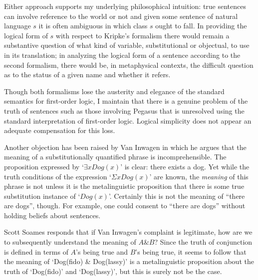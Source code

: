 \documentclass[12pt,letterpaper]{article}
\begin{document}
\begin{doublespace}
Either approach supports my underlying philosophical intuition: true
sentences can involve reference to the world or not and given some
sentence of natural language $s$ it is often ambiguous in which class
$s$ ought to fall.  In providing the logical form of $s$ with respect
to Kripke's formalism there would remain a substantive question of
what kind of variable, substitutional or objectual, to use in its
translation; in analyzing the logical form of a sentence according to
the second formalism, there would be, in metaphysical contexts,
the difficult question as to the status of a given name and whether it
refers.

Though both formalisms lose the austerity and elegance of the standard
semantics for first-order logic, I maintain that there is a genuine
problem of the truth of sentences such as those involving Pegasus that
is unresolved using the standard interpretation of first-order logic.
Logical simplicity does not appear an adequate compensation for this
loss.

Another objection has been raised by Van Inwagen \cite{inwagen} in
which he argues that the meaning of a substitutionally quantified
phrase is incomprehensible.  The proposition expressed by `$\exists
xDog(x)$' is clear: there exists a dog. Yet while the truth conditions
of the expression `$\Sigma xDog(x)$' are known, the \emph{meaning} of
this phrase is not unless it is the metalinguistic proposition that
there is some true substitution instance of `$Dog(x)$'.  Certainly this
is not the meaning of ``there are dogs'', though.  For example, one
could consent to ``there are dogs'' without holding beliefs about
sentences.

Scott Soames \cite[p.91]{soames} responds that if Van Inwagen's
complaint is legitimate, how are we to subsequently understand the
meaning of $A \& B$?  Since the truth of conjunction is defined in
terms of $A$'s being true and $B$'s being true, it seems to follow
that the meaning of `Dog(fido) \& Dog(lassy)' is a metalinguistic
proposition about the truth of `Dog(fido)' and `Dog(lassy)', but
this is surely not be the case.


\end{doublespace}
\end{document}
